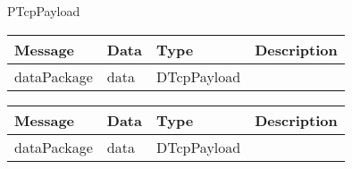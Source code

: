  {PTcpPayload}

\begin{tabular}[ht]{|l|l|l|p{8cm}|}
\hline
Message & Data & Type & Description\\
\hline
dataPackage &  data  &  DTcpPayload  & \\
\hline
\end{tabular}
\begin{tabular}[ht]{|l|l|l|p{8cm}|}
\hline
Message & Data & Type & Description\\
\hline
dataPackage &  data  &  DTcpPayload  & \\
\hline
\end{tabular}
